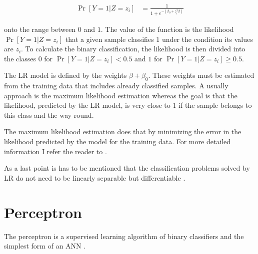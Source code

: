 \begin{align*}
\Pr[Y = 1 | Z = z_i] &= \frac{1}{1 + e^{-(\beta_0 + z^T_i \beta)}}
\end{align*}

onto the range between $0$ and $1$.
The value of the function is the likelihood $\Pr[Y = 1 | Z = z_i]$ that a given sample classifies $1$ under the condition its values are $z_i$.
To calculate the binary classification, the likelihood is then divided into the classes $0$ for $\Pr[Y = 1 | Z = z_i] < 0.5$ and $1$ for $\Pr[Y = 1 | Z = z_i] \ge 0.5$. %

The \ac{LR} model is defined by the weights $\beta + \beta_0$. %
These weights must be estimated from the training data that includes already classified samples.
A usually approach is the maximum likelihood estimation whereas the goal is that the likelihood, predicted by the \ac{LR} model, is very close to $1$ if the sample belongs to this class and the way round. %

The maximum likelihood estimation does that by minimizing the error in the likelihood predicted by the model for the training data. %
For more detailed information I refer the reader to \cite{Wikipedia2017MaximumEstimation}.

As a last point is has to be mentioned that the classification problems solved by \ac{LR} do not need to be linearly separable but differentiable \cite{Ruhrmair2010ModelingFunctions}.


\section{Perceptron}
\label{sec:perceptron}

The perceptron is a supervised learning algorithm of binary classifiers and the simplest form of an \ac{ANN} \cite{Rosenblatt1957TheAutomaton}. 

